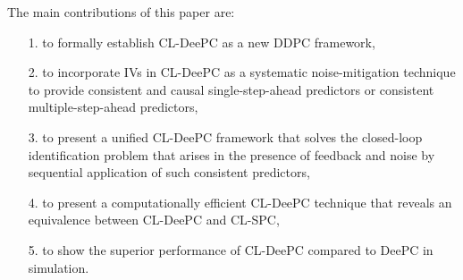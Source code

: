 The main contributions of this paper are: 
\begin{enumerate}%
\item[1.] to formally establish \acf{CL-DeePC} as a new \ac{DDPC} framework, \label{contribution:develop_CL_DeePC}
\item[2.] to incorporate \ac{IVs} in \ac{CL-DeePC} as a systematic noise-mitigation technique to provide consistent and causal single-step-ahead predictors or consistent multiple-step-ahead predictors, \label{contribution:incorporate_IVs}
\item[3.] to present a unified \ac{CL-DeePC} framework that solves the closed-loop identification problem that arises in the presence of feedback and noise by sequential application of such consistent predictors,\label{contribution:solves_CL_issue}
\item[4.] to present a computationally efficient \ac{CL-DeePC} technique that reveals an equivalence between \ac{CL-DeePC} and \ac{CL-SPC},
\item[5.] to show the superior performance of \ac{CL-DeePC} compared to \ac{DeePC} in simulation.
\end{enumerate}
%

